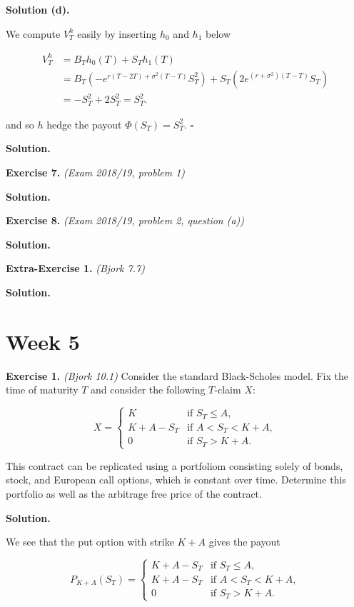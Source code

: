 \documentclass[
]{book}
\begin{document}
\textbf{Solution (d).}

We compute \(V_T^h\) easily by inserting \(h_0\) and \(h_1\) below

\begin{align*}
V_T^h&=B_Th_0(T)+S_Th_1(T)\\
&=B_T\left(-e^{r(T-2T)+\sigma^2(T-T)}S_T^2\right)+S_T\left(2e^{(r+\sigma^2)(T-T)}S_T\right)\\
&=-S_T^2+2S_T^2=S_T^2.
\end{align*}

and so \(h\) hedge the payout \(\Phi(S_T)=S_T^2\). \(\square\)

\textbf{Solution.}

\textbf{Exercise 7.} \emph{(Exam 2018/19, problem 1)}

\textbf{Solution.}

\textbf{Exercise 8.} \emph{(Exam 2018/19, problem 2, question (a))}

\textbf{Solution.}

\textbf{Extra-Exercise 1.} \emph{(Bjork 7.7)}

\textbf{Solution.}

\hypertarget{week-5}{%
\section{Week 5}\label{week-5}}

\textbf{Exercise 1.} \emph{(Bjork 10.1)} Consider the standard Black-Scholes model. Fix the time of maturity \(T\) and consider the following \(T\)-claim \(X\):

\[
X=
\begin{cases}
  K & \text{if }S_T\le A,\\
  K+A-S_T & \text{if }A<S_T<K+ A,\\
  0 & \text{if }S_T > K+ A.
\end{cases}  
\]

This contract can be replicated using a portfoliom consisting solely of bonds, stock, and European call options, which is constant over time. Determine this portfolio as well as the arbitrage free price of the contract.

\textbf{Solution.}

We see that the put option with strike \(K+A\) gives the payout

\[
P_{K+A}(S_T)=
\begin{cases}
  K+A-S_T & \text{if }S_T\le A,\\
  K+A-S_T & \text{if }A<S_T<K+ A,\\
  0 & \text{if }S_T > K+ A.
\end{cases}
\]
\end{document}
